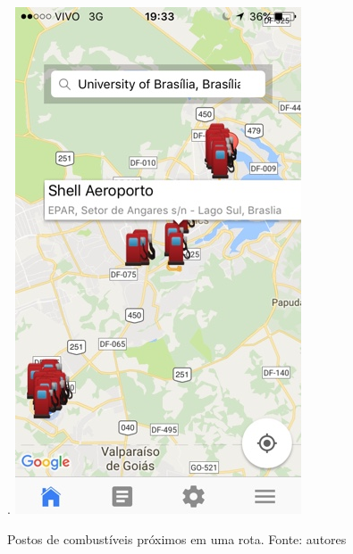 \begin{figure}[H]
    \centering.
    \includegraphics[scale=0.5]{figuras/app_5.jpg}
    \caption[Postos de combustíveis próximos em uma rota]{Postos de combustíveis próximos em uma rota. Fonte: autores}
    \label{img:postos_de_gasolina_proximos_em_uma_rota}
\end{figure}
